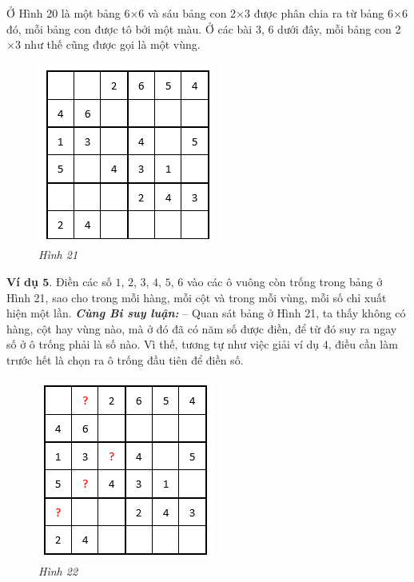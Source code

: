 		Ở Hình 20 là một bảng 6$\times$6 và sáu bảng con 2$\times$3 được phân chia ra từ bảng 6$\times$6 đó, mỗi bảng con được tô bởi một màu. Ở các bài 3, 6 dưới đây, mỗi bảng con 2$\times$3 như thế cũng được gọi là một vùng.
		\vskip 0.1cm
		\begin{figure}
			\centering
			\vspace*{-5pt}
			\captionsetup{labelformat= empty, justification=centering}
			\includegraphics[scale=0.5]{pic10}
			\vspace*{-5pt}
			\caption{\small\textit{Hình 21}}
			\vspace*{-15pt}
		\end{figure}
	\textbf{Ví dụ $\pmb{5.}$} Điền các số $1$, $2$, $3$, $4$, $5$, $6$ vào các ô vuông còn trống trong bảng ở Hình 21, sao cho trong mỗi hàng, mỗi cột và trong mỗi vùng, mỗi số chỉ xuất hiện một lần.
	\vskip 0.1cm
	\textbf{\textit{Cùng Bi suy luận:}}
	\vskip 0.05cm
	-- Quan sát bảng ở Hình 21, ta thấy không có hàng, cột hay vùng nào, mà ở đó đã có năm số được điền, để từ đó suy ra ngay số ở ô trống phải là số nào. Vì thế, tương tự như việc giải ví dụ $4$, điều cần làm trước hết là chọn ra ô trống đầu tiên để điền số.
	\vskip 0.05cm
	\begin{figure}
		\centering
		\vspace*{-15pt}
		\captionsetup{labelformat= empty, justification=centering}
		\includegraphics[scale=0.5]{pic11}
		\vspace*{-5pt}
		\caption{\small\textit{Hình 22}}
		\vspace*{-15pt}
	\end{figure}
